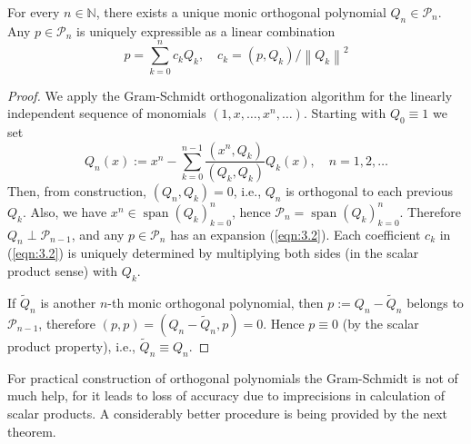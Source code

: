 \documentclass[a4paper]{article}
\begin{document}
\begin{lemma}
    For every $n \in \mathbb{N}$, there exists a unique monic orthogonal polynomial $Q_n \in \mathcal{P}_n$. Any $p \in \mathcal{P}_n$ is uniquely expressible as a linear combination
    \begin{equation}\label{eqn:3.2}
        p=\sum_{k=0}^n c_k Q_k, \quad c_k=\left(p, Q_k\right) /\left\|Q_k\right\|^2
    \end{equation}
\end{lemma}
\begin{proof}
    We apply the Gram-Schmidt orthogonalization algorithm for the linearly independent sequence of monomials $\left(1, x, \ldots, x^n, \ldots\right)$. Starting with $Q_0 \equiv 1$ we set
\[
Q_n(x):=x^n-\sum_{k=0}^{n-1} \frac{\left(x^n, Q_k\right)}{\left(Q_k, Q_k\right)} Q_k(x), \quad n=1,2, \ldots
\]
Then, from construction, $\left(Q_n, Q_k\right)=0$, i.e., $Q_n$ is orthogonal to each previous $Q_k$. Also, we have $x^n \in \operatorname{span}\left(Q_k\right)_{k=0}^n$, hence $\mathcal{P}_n=\operatorname{span}\left(Q_k\right)_{k=0}^n$. Therefore $Q_n \perp \mathcal{P}_{n-1}$, and any $p \in \mathcal{P}_n$ has an expansion (\ref{eqn:3.2}). Each coefficient $c_k$ in (\ref{eqn:3.2}) is uniquely determined by multiplying both sides (in the scalar product sense) with $Q_k$.

If $\widetilde{Q}_n$ is another $n$-th monic orthogonal polynomial, then $p:=Q_n-\widetilde{Q}_n$ belongs to $\mathcal{P}_{n-1}$, therefore $(p, p)=\left(Q_n-\widetilde{Q}_n, p\right)=0$. Hence $p \equiv 0$ (by the scalar product property), i.e., $\widetilde{Q}_n \equiv Q_n$.
\end{proof}
\begin{remark}
    For practical construction of orthogonal polynomials the Gram-Schmidt is not of much help, for it leads to loss of accuracy due to imprecisions in calculation of scalar products. A considerably better procedure is being provided by the next theorem.
\end{remark}
\end{document}
